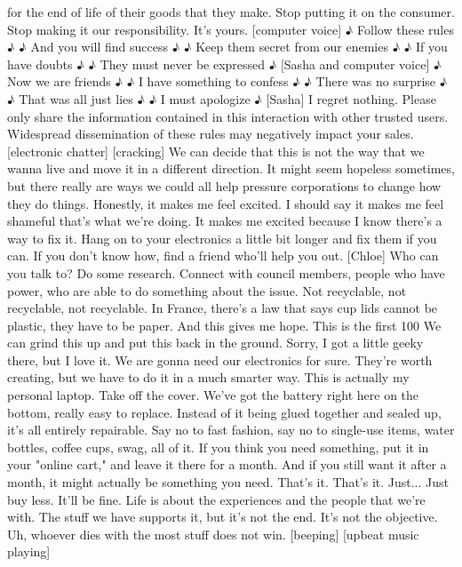\documentclass[a4paper]{article}
\begin{document}
	for the end of life of their goods that they make.
	Stop putting it on the consumer.
	Stop making it our responsibility.
	It's yours.
	[computer voice] ♪ Follow these rules ♪
	♪ And you will find success ♪
	♪ Keep them secret from our enemies ♪
	♪ If you have doubts ♪
	♪ They must never be expressed ♪
	[Sasha and computer voice] ♪ Now we are friends ♪
	♪ I have something to confess ♪
	♪ There was no surprise ♪
	♪ That was all just lies ♪
	♪ I must apologize ♪
	[Sasha] I regret nothing.
	Please only share the information contained in this interaction
	with other trusted users.
	Widespread dissemination of these rules may negatively impact your sales.
	[electronic chatter]
	[cracking]
	We can decide that this is not the way that we wanna live
	and move it in a different direction.
	It might seem hopeless sometimes, but there really are ways
	we could all help pressure corporations to change how they do things.
	Honestly, it makes me feel excited.
	I should say it makes me feel shameful that's what we're doing.
	It makes me excited because I know there's a way to fix it.
	Hang on to your electronics a little bit longer and fix them if you can.
	If you don't know how, find a friend who'll help you out.
	[Chloe] Who can you talk to? Do some research.
	Connect with council members, people who have power,
	who are able to do something about the issue.
	Not recyclable, not recyclable, not recyclable.
	In France, there's a law that says
	cup lids cannot be plastic, they have to be paper.
	And this gives me hope.
	This is the first 100%
	We can grind this up and put this back in the ground.
	Sorry, I got a little geeky there, but I love it.
	We are gonna need our electronics for sure.
	They're worth creating, but we have to do it in a much smarter way.
	This is actually my personal laptop.
	Take off the cover.
	We've got the battery right here on the bottom,
	really easy to replace.
	Instead of it being glued together and sealed up,
	it's all entirely repairable.
	Say no to fast fashion, say no to single-use items,
	water bottles, coffee cups,
	swag, all of it.
	If you think you need something, put it in your "online cart,"
	and leave it there for a month.
	And if you still want it after a month, it might actually be something you need.
	That's it. That's it. Just... Just buy less.
	It'll be fine.
	Life is about the experiences and the people that we're with.
	The stuff we have supports it, but it's not the end.
	It's not the objective.
	Uh, whoever dies with the most stuff does not win.
	[beeping]
	[upbeat music playing]
	
	

	
\end{document}
